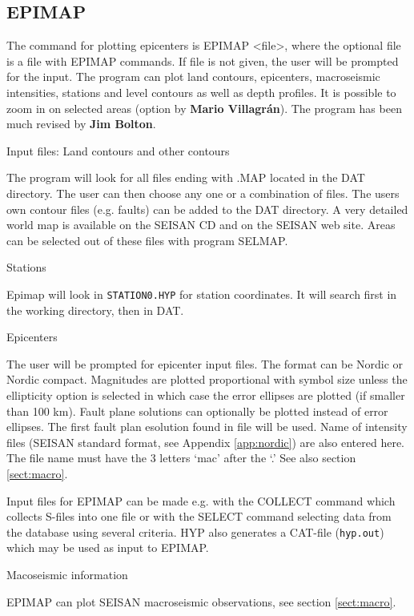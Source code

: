 
\subsection{EPIMAP} 

The command for plotting epicenters is EPIMAP <file>, where the optional file is a file with EPIMAP commands. If file is not given, the user will be prompted for the input. The program can plot land contours, epicenters, macroseismic intensities, stations and level contours as well as depth profiles. It is possible to zoom in on selected areas (option by \textbf{Mario Villagr\'an}). The program has been much revised by \textbf{Jim Bolton}. 

Input files: Land contours and other contours 

The program will look for all files ending with .MAP located in the DAT directory. The user can then choose any one or a combination of files. The users own contour files (e.g. faults) can be added to the DAT directory. A very detailed world map is available on the SEISAN CD and on the SEISAN web site. Areas can be selected out of these files with program SELMAP. 

Stations 

Epimap will look in \texttt{STATION0.HYP} for station coordinates. It will search first in the working directory, then in DAT. 

Epicenters 

The user will be prompted for epicenter input files. The format can 
be Nordic or Nordic compact. Magnitudes are plotted proportional with 
symbol size unless the ellipticity option is selected in which case 
the error ellipses are plotted (if smaller than 100 km).
Fault plane solutions can optionally be plotted instead of error 
ellipses. The first fault plan esolution found in file will be used. Name of 
intensity files (SEISAN standard format, see Appendix \ref{app:nordic}) are also 
entered here. The file name must have the 3 letters `mac' after the `.' 
See also section \ref{sect:macro}. 

Input files for EPIMAP can be made e.g. with the COLLECT command which collects S-files into one file or with the SELECT command selecting data from the database using several criteria.  HYP also generates a CAT-file (\texttt{hyp.out}) which may be used as input to EPIMAP. 

Macoseismic information 

EPIMAP can plot SEISAN macroseismic observations, see section \ref{sect:macro}.

